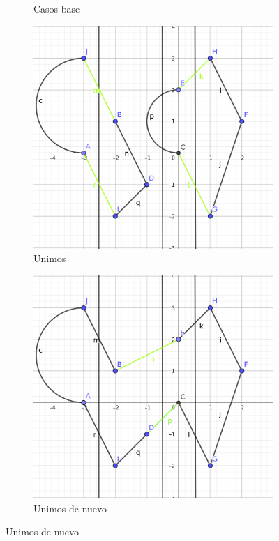 \documentclass{article}
\begin{document}
\begin{figure}[H]
\begin{subfigure}[b]{0.3\textwidth}
        \caption{\centering Casos base}
        \label{fig:p3_ejemplo}
    \end{subfigure}
    \hfill
    \begin{subfigure}[b]{0.3\textwidth}
        \centering
        \includegraphics[width=\textwidth]{P3/Prosa/ejemplo_unir.png}
        \caption{\centering Unimos}
        \label{fig:p3_ejemplo}
    \end{subfigure}
    \hfill
    \begin{subfigure}[b]{0.3\textwidth}
        \centering
        \includegraphics[width=\textwidth]{P3/Prosa/ejemplo_unir2.png}
        \caption{\centering Unimos de nuevo}
        \label{fig:p3_ejemplo}
    \end{subfigure}
\end{figure}
\end{document}
